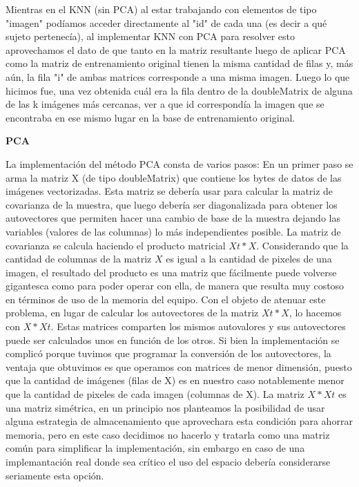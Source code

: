 Mientras en el KNN (sin PCA) al estar trabajando con elementos de tipo "imagen" podíamos acceder directamente al "id" de cada una (es decir a qué sujeto pertenecía), al implementar KNN con PCA para resolver esto aprovechamos el dato de que tanto en la matriz resultante luego de aplicar PCA como la matriz de entrenamiento original tienen la misma cantidad de filas y, más aún, la fila "i" de ambas matrices corresponde a una misma imagen.
Luego lo que hicimos fue, una vez obtenida cuál era la fila dentro de la doubleMatrix de alguna de las k imágenes más cercanas, ver a que id correspondía la imagen que se encontraba en ese mismo lugar en la base de entrenamiento original. 


\textbf{PCA}

La implementación del método PCA consta de varios pasos:
En un primer paso se arma la matriz X (de tipo doubleMatrix) que contiene los bytes de datos de las imágenes vectorizadas. Esta matriz se debería usar para calcular la matriz de covarianza de la muestra, que luego debería ser diagonalizada para obtener los autovectores que permiten hacer una cambio de base de la muestra dejando las variables (valores de las columnas) lo más independientes posible.
La matriz de covarianza se calcula haciendo el producto matricial $X{t} * X$. Considerando que la cantidad de columnas de la matriz $X$ es igual a la cantidad de pixeles de una imagen, el resultado del producto es una matriz que fácilmente puede volverse gigantesca como para poder operar con ella, de manera que resulta muy costoso en términos de uso de la memoria del equipo. Con el objeto de atenuar este problema, en lugar de calcular los autovectores de la matriz $X{t} * X$, lo hacemos con $X * X{t}$. Estas matrices comparten los mismos autovalores y sus autovectores puede ser calculados unos en función de los otros. Si bien la implementación se complicó porque tuvimos que programar la conversión de los autovectores, la ventaja que obtuvimos es que operamos con matrices de menor dimensión, puesto que la cantidad de imágenes (filas de X) es en nuestro caso notablemente menor que la cantidad de pixeles de cada imagen (columnas de X).
La matriz $X * X{t}$ es una matriz simétrica, en un principio nos planteamos la posibilidad de usar alguna estrategia de almacenamiento que aprovechara esta condición para ahorrar memoria, pero en este caso decidimos no hacerlo y tratarla como una matriz común para simplificar la implementación, sin embargo en caso de una implemantación real donde sea crítico el uso del espacio debería considerarse seriamente esta opción.

